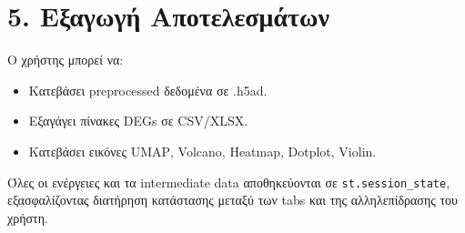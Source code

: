 \section*{5. Εξαγωγή Αποτελεσμάτων}
Ο χρήστης μπορεί να:
\begin{itemize}
  \item Κατεβάσει \foreignlanguage{english}{preprocessed} δεδομένα σε \foreignlanguage{english}{.h5ad}.
  \item Εξαγάγει πίνακες \foreignlanguage{english}{DEGs} σε \foreignlanguage{english}{CSV/XLSX}.
  \item Κατεβάσει εικόνες \foreignlanguage{english}{UMAP}, \foreignlanguage{english}{Volcano}, \foreignlanguage{english}{Heatmap, Dotplot, Violin}.
\end{itemize}

Όλες οι ενέργειες και τα \foreignlanguage{english}{intermediate data} αποθηκεύονται σε \foreignlanguage{english}{\texttt{st.session\_state}}, εξασφαλίζοντας διατήρηση κατάστασης μεταξύ των \foreignlanguage{english}{tabs} και της αλληλεπίδρασης του χρήστη.
